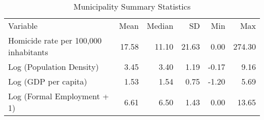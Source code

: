 \documentclass{article}
\begin{document}
\begin{table}[h]
\centering
\caption{Municipality Summary Statistics}
\label{tab:summary_stats}
\begin{tabular}{lrrrrr}
  \toprule
  Variable & Mean & Median & SD & Min & Max \\ 
  Homicide rate per 100,000 inhabitants & 17.58 & 11.10 & 21.63 & 0.00 & 274.30 \\ 
  Log (Population Density) & 3.45 & 3.40 & 1.19 & -0.17 & 9.16 \\ 
  Log (GDP per capita) & 1.53 & 1.54 & 0.75 & -1.20 & 5.69 \\ 
  Log (Formal Employment + 1) & 6.61 & 6.50 & 1.43 & 0.00 & 13.65 \\ 
   \bottomrule
\end{tabular}
\end{table}
\end{document}
